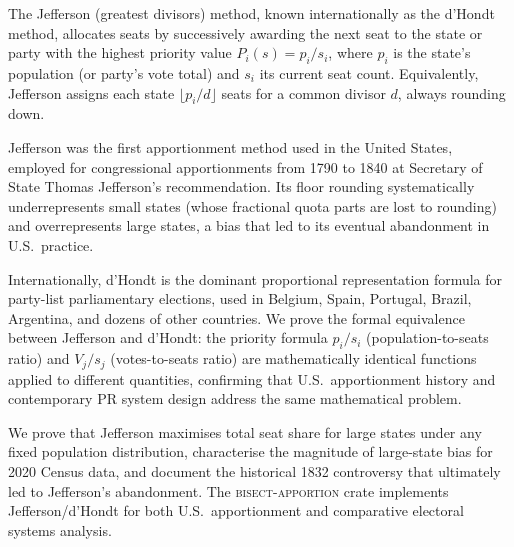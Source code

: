 The Jefferson (greatest divisors) method, known internationally as
the d'Hondt method, allocates seats by successively awarding the
next seat to the state or party with the highest priority value
$P_i(s) = p_i/s_i$, where $p_i$ is the state's population (or party's
vote total) and $s_i$ its current seat count.
Equivalently, Jefferson assigns each state $\lfloor p_i/d \rfloor$
seats for a common divisor $d$, always rounding down.

Jefferson was the first apportionment method used in the United States,
employed for congressional apportionments from 1790 to 1840 at
Secretary of State Thomas Jefferson's recommendation.
Its floor rounding systematically underrepresents small states
(whose fractional quota parts are lost to rounding) and
overrepresents large states, a bias that led to its eventual
abandonment in U.S.\ practice.

Internationally, d'Hondt is the dominant proportional representation
formula for party-list parliamentary elections, used in Belgium, Spain,
Portugal, Brazil, Argentina, and dozens of other countries.
We prove the formal equivalence between Jefferson and d'Hondt:
the priority formula $p_i/s_i$ (population-to-seats ratio) and
$V_j/s_j$ (votes-to-seats ratio) are mathematically identical
functions applied to different quantities, confirming that U.S.\
apportionment history and contemporary PR system design address
the same mathematical problem.

We prove that Jefferson maximises total seat share for large states
under any fixed population distribution, characterise the magnitude
of large-state bias for 2020 Census data, and document the historical
1832 controversy that ultimately led to Jefferson's abandonment.
The \textsc{bisect-apportion} crate implements Jefferson/d'Hondt
for both U.S.\ apportionment and comparative electoral systems analysis.
